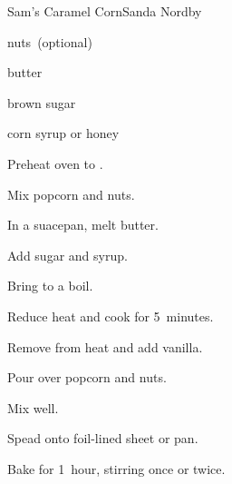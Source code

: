 \begin{recipe}{Sam's Caramel Corn}{Sanda Nordby}{}

\begin{ingredients}
\item {} 
\item {} nuts~(optional)
\item \C{\half} butter
\item {} brown sugar
\item \C{\quarter} corn syrup or honey
\item {}
\end{ingredients}

\begin{directions}
\item Preheat oven to .
\item Mix popcorn and nuts.
\item In a suacepan, melt butter.
\item Add sugar and syrup.
\item Bring to a boil.
\item Reduce heat and cook for 5~minutes.
\item Remove from heat and add vanilla.
\item Pour over popcorn and nuts.
\item Mix well.
\item Spead onto foil-lined sheet or pan.
\item Bake for 1~hour, stirring once or twice.
\end{directions}

\end{recipe}
